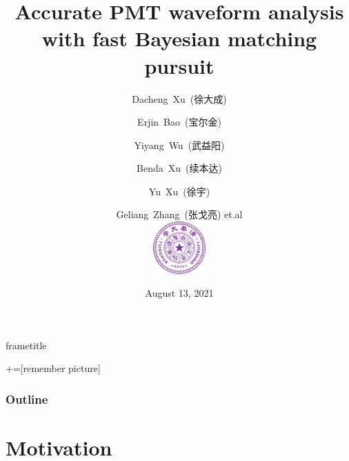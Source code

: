 \documentclass{beamer}
\title[Waveform Analysis]{Accurate PMT waveform analysis \\ with fast Bayesian matching pursuit}
\date[JUNO]{August 13, 2021}
\begin{document}
{\begin{beamercolorbox}[wd=\paperwidth]{frametitle}
    \strut\hspace{0.5em}\insertframetitle\strut
    \hfill
\end{beamercolorbox}
}
+=[remember picture]

\begin{CJK*}{UTF8}{gbsn}
\author[Dacheng Xu]{Dacheng~Xu~(徐大成) \and Erjin~Bao~(宝尔金) \and Yiyang~Wu~(武益阳) \and Benda~Xu~(续本达) \and Yu~Xu~(徐宇) \and Geliang~Zhang~(张戈亮) et.al \\ [4mm] \includegraphics[height=2cm]{img/Tsinghua_University_Logo.png}}

\frame{\titlepage}

\begin{frame}[noframenumbering]
\frametitle{Outline}
\thispagestyle{empty}
\tableofcontents
\end{frame}

\section{Motivation}


\end{CJK*}
\end{document}

